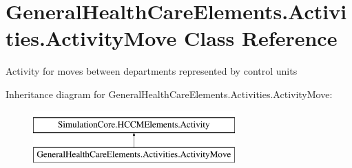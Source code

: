 \hypertarget{class_general_health_care_elements_1_1_activities_1_1_activity_move}{}\section{General\+Health\+Care\+Elements.\+Activities.\+Activity\+Move Class Reference}
\label{class_general_health_care_elements_1_1_activities_1_1_activity_move}


Activity for moves between departments represented by control units  


Inheritance diagram for General\+Health\+Care\+Elements.\+Activities.\+Activity\+Move\+:\begin{figure}[H]
\begin{center}
\leavevmode
\includegraphics[height=2.000000cm]{class_general_health_care_elements_1_1_activities_1_1_activity_move}
\end{center}
\end{figure}
